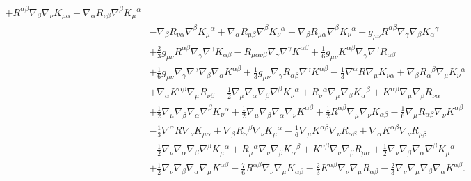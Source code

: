 \documentclass[10pt,letterpaper]{article}
\begin{document}
\begin{align}
 + R^{\alpha \beta} \nabla_{\beta}\nabla_{\nu}K_{\mu \alpha}
 + \nabla_{\alpha}R_{\nu \beta} \nabla^{\beta}K_{\mu}{}^{\alpha}\nonumber\\
& -  \nabla_{\beta}R_{\nu \alpha} \nabla^{\beta}K_{\mu}{}^{\alpha}
 + \nabla_{\alpha}R_{\mu \beta} \nabla^{\beta}K_{\nu}{}^{\alpha}
 -  \nabla_{\beta}R_{\mu \alpha} \nabla^{\beta}K_{\nu}{}^{\alpha}
 -  g_{\mu \nu} R^{\alpha \beta} \nabla_{\gamma}\nabla_{\beta}K_{\alpha}{}^{\gamma}\nonumber\\
& + \tfrac{2}{3} g_{\mu \nu} R^{\alpha \beta} \nabla_{\gamma}\nabla^{\gamma}K_{\alpha \beta}
 -  R_{\mu \alpha \nu \beta} \nabla_{\gamma}\nabla^{\gamma}K^{\alpha \beta}
 + \tfrac{1}{6} g_{\mu \nu} K^{\alpha \beta} \nabla_{\gamma}\nabla^{\gamma}R_{\alpha \beta}\nonumber\\
& + \tfrac{1}{6} g_{\mu \nu} \nabla_{\gamma}\nabla^{\gamma}\nabla_{\beta}\nabla_{\alpha}K^{\alpha \beta}
 + \tfrac{1}{3} g_{\mu \nu} \nabla_{\gamma}R_{\alpha \beta} \nabla^{\gamma}K^{\alpha \beta}
 -  \tfrac{1}{3} \nabla^{\alpha}R \nabla_{\mu}K_{\nu \alpha}
 + \nabla_{\beta}R_{\alpha}{}^{\beta} \nabla_{\mu}K_{\nu}{}^{\alpha}\nonumber\\
& + \nabla_{\alpha}K^{\alpha \beta} \nabla_{\mu}R_{\nu \beta}
 -  \tfrac{1}{2} \nabla_{\mu}\nabla_{\alpha}\nabla_{\beta}\nabla^{\beta}K_{\nu}{}^{\alpha}
 + R_{\nu}{}^{\alpha} \nabla_{\mu}\nabla_{\beta}K_{\alpha}{}^{\beta}
 + K^{\alpha \beta} \nabla_{\mu}\nabla_{\beta}R_{\nu \alpha}\nonumber\\
& + \tfrac{1}{2} \nabla_{\mu}\nabla_{\beta}\nabla_{\alpha}\nabla^{\beta}K_{\nu}{}^{\alpha}
 + \tfrac{1}{2} \nabla_{\mu}\nabla_{\beta}\nabla_{\alpha}\nabla_{\nu}K^{\alpha \beta}
 + \tfrac{1}{2} R^{\alpha \beta} \nabla_{\mu}\nabla_{\nu}K_{\alpha \beta}
 -  \tfrac{1}{6} \nabla_{\mu}R_{\alpha \beta} \nabla_{\nu}K^{\alpha \beta}\nonumber\\
& -  \tfrac{1}{3} \nabla^{\alpha}R \nabla_{\nu}K_{\mu \alpha}
 + \nabla_{\beta}R_{\alpha}{}^{\beta} \nabla_{\nu}K_{\mu}{}^{\alpha}
 -  \tfrac{1}{6} \nabla_{\mu}K^{\alpha \beta} \nabla_{\nu}R_{\alpha \beta}
 + \nabla_{\alpha}K^{\alpha \beta} \nabla_{\nu}R_{\mu \beta}\nonumber\\
& -  \tfrac{1}{2} \nabla_{\nu}\nabla_{\alpha}\nabla_{\beta}\nabla^{\beta}K_{\mu}{}^{\alpha}
 + R_{\mu}{}^{\alpha} \nabla_{\nu}\nabla_{\beta}K_{\alpha}{}^{\beta}
 + K^{\alpha \beta} \nabla_{\nu}\nabla_{\beta}R_{\mu \alpha}
 + \tfrac{1}{2} \nabla_{\nu}\nabla_{\beta}\nabla_{\alpha}\nabla^{\beta}K_{\mu}{}^{\alpha}\nonumber\\
& + \tfrac{1}{2} \nabla_{\nu}\nabla_{\beta}\nabla_{\alpha}\nabla_{\mu}K^{\alpha \beta}
 -  \tfrac{7}{6} R^{\alpha \beta} \nabla_{\nu}\nabla_{\mu}K_{\alpha \beta}
 -  \tfrac{2}{3} K^{\alpha \beta} \nabla_{\nu}\nabla_{\mu}R_{\alpha \beta}
 -  \tfrac{2}{3} \nabla_{\nu}\nabla_{\mu}\nabla_{\beta}\nabla_{\alpha}K^{\alpha \beta}.
\end{align}
\end{document}
